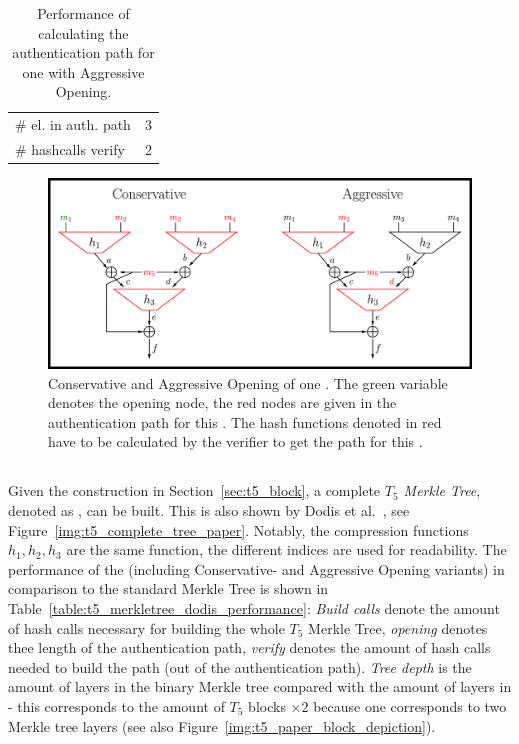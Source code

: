 \begin{table}
\centering
\begin{tabular}{l c} 
 \hline\noalign{\smallskip}
 \multicolumn{2}{c}{\textbf{Aggressive Opening}} \\
 \hline\noalign{\smallskip}
 \# el. in auth. path & 3 \\
 \# hashcalls verify & 2 \\
 \hline
\end{tabular}
\caption{Performance of calculating the authentication path for one \tfblock with Aggressive Opening.}
\label{table:aggr_opening}
\end{table}



\begin{figure}
\centering
\includegraphics[]{images/Methods/aggr_conserv_opening_T5.png}
\caption{Conservative and Aggressive Opening of one \tfblock. The green variable denotes the opening node, the red nodes are given in the authentication path for this \tfblock. The hash functions denoted in red have to be calculated by the verifier to get the path for this \tfblock.~\cite{T5_paper}}
\label{img:t5_conserv_aggr_opening}
\end{figure}

\subsection{\texorpdfstring{\tftree}{T5 Merkle Tree}}
\label{sec:dodis_t5_merkle_tree}
Given the \tfblock construction in Section~\ref{sec:t5_block}, a complete \textit{$T_5$ Merkle Tree}, denoted as \textit{\tftree}, can be built. This is also shown by Dodis et al.~\cite{T5_paper}, see Figure~\ref{img:t5_complete_tree_paper}. Notably, the compression functions $h_1, h_2, h_3$ are the same function, the different indices are used for readability. The performance of the \tftree (including Conservative- and Aggressive Opening variants) in comparison to the standard Merkle Tree is shown in Table~\ref{table:t5_merkletree_dodis_performance}: \textit{Build calls} denote the amount of hash calls necessary for building the whole $T_5$ Merkle Tree, \textit{opening} denotes thee length of the authentication path, \textit{verify} denotes the amount of hash calls needed to build the path (out of the authentication path). \textit{Tree depth} is the amount of layers in the binary Merkle tree compared with the amount of layers in \tftree - this corresponds to the amount of $T_5$ blocks $\times 2$ because one \tfblock corresponds to two Merkle tree layers (see also Figure~\ref{img:t5_paper_block_depiction}).

